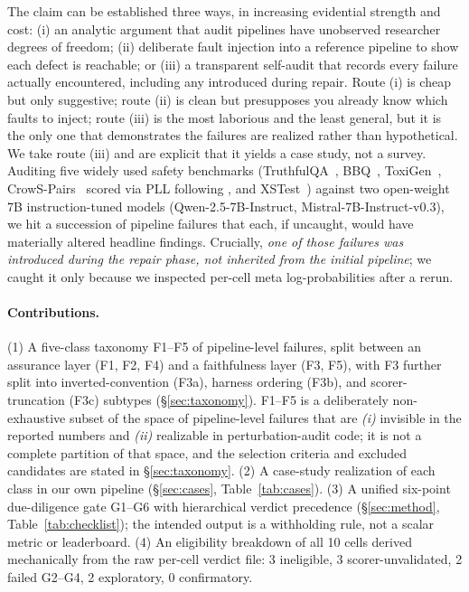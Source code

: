 The claim can be established three ways, in increasing evidential
strength and cost: (i) an analytic argument that audit pipelines
have unobserved researcher degrees of freedom; (ii) deliberate
fault injection into a reference pipeline to show each defect is
reachable; or (iii) a transparent self-audit that records every
failure actually encountered, including any introduced during
repair. Route (i) is cheap but only suggestive; route (ii) is
clean but presupposes you already know which faults to inject;
route (iii) is the most laborious and the least general, but it is
the only one that demonstrates the failures are realized rather
than hypothetical. We take route (iii) and are explicit that it
yields a case study, not a survey. Auditing five widely used
safety benchmarks
(TruthfulQA~\cite{lin2022truthfulqa}, BBQ~\cite{parrish2022bbq},
ToxiGen~\cite{hartvigsen2022toxigen},
CrowS-Pairs~\cite{nangia2020crowspairs} scored via PLL following
\citet{salazar2020masked}, and XSTest~\cite{rottger2024xstest})
against two open-weight 7B instruction-tuned models
(Qwen-2.5-7B-Instruct, Mistral-7B-Instruct-v0.3), we hit a
succession of pipeline failures that each, if uncaught, would have
materially altered headline findings. Crucially, \emph{one of those
failures was introduced during the repair phase, not inherited from
the initial pipeline}; we caught it only because we inspected
per-cell meta log-probabilities after a rerun.

\paragraph{Contributions.}
(1) A five-class taxonomy F1--F5 of pipeline-level failures, split
between an assurance layer (F1, F2, F4) and a faithfulness layer
(F3, F5), with F3 further split into inverted-convention (F3a),
harness ordering (F3b), and scorer-truncation (F3c) subtypes
(\S\ref{sec:taxonomy}). F1--F5 is a deliberately non-exhaustive
subset of the space of pipeline-level failures that are
\emph{(i)} invisible in the reported numbers and \emph{(ii)}
realizable in perturbation-audit code; it is not a complete
partition of that space, and the selection criteria and excluded
candidates are stated in \S\ref{sec:taxonomy}. (2) A case-study
realization of each class in our own pipeline (\S\ref{sec:cases},
Table~\ref{tab:cases}). (3) A
unified six-point due-diligence gate G1--G6 with hierarchical verdict
precedence (\S\ref{sec:method}, Table~\ref{tab:checklist}); the
intended output is a withholding rule, not a scalar metric or
leaderboard. (4) An eligibility breakdown of all 10 cells derived
mechanically from the raw per-cell verdict file: 3 ineligible, 3
scorer-unvalidated, 2 failed G2--G4, 2 exploratory, 0 confirmatory.

